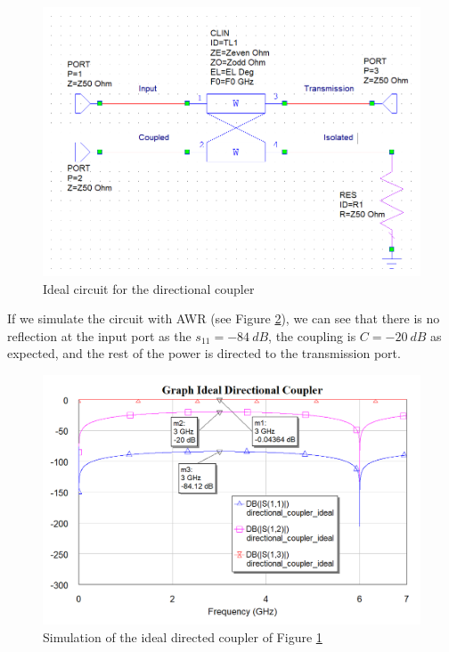 \documentclass[12pt]{report} %
\begin{document}
\begin{figure}[htbp]
    \centering
    \includegraphics[width=\textwidth]{images/design_circuit_elements/directional_coupler_ideal_circuit.png}
    \caption{Ideal circuit for the directional coupler}
    \label{fig:design_circuit_elements:directional_coupler_ideal_circuit}
\end{figure}

If we simulate the circuit with AWR (see Figure \ref{fig:design_circuit_elements:directional_coupler_ideal_graph}), we can see that there is no reflection at the input port as the $s_{11} = -84 \ dB$, the coupling is $C = -20 \ dB$ as expected, and the rest of the power is directed to the transmission port.

\begin{figure}[htbp]
    \centering
    \includegraphics[width=\linewidth]{images//design_circuit_elements/directional_coupler_ideal_graph.png}
    \caption{Simulation of the ideal directed coupler of Figure \ref{fig:design_circuit_elements:directional_coupler_ideal_circuit}}
    \label{fig:design_circuit_elements:directional_coupler_ideal_graph}
\end{figure}
\end{document}
